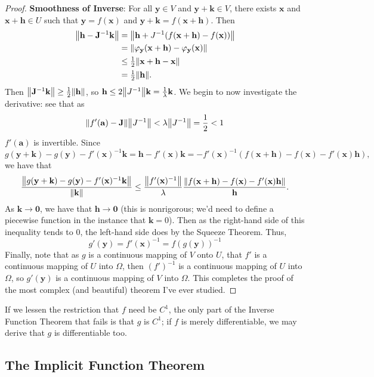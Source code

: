 \documentclass[11pt]{article}
\renewcommand{\vec}[1]{\mathbf{#1}}
\newcommand{\mat}[1]{\mathbf{#1}}
\begin{document}
\begin{adjustwidth}{0.5cm}{}
\begin{proof}
		\textbf{Smoothness of Inverse}: For all $\vec{y} \in V$ and $\vec{y + k} \in V$, there exists $\vec{x}$ and $\vec{x} + \vec{h} \in U$ such that $\vec{y} = f(\vec{x})$ and $\vec{y} + \vec{k} = f(\vec{x} + \vec{h})$. Then
		\begin{align*}
			\norm{\vec{h} - \mat{J}^{-1} \vec{k}} &= \norm{\vec{h} + J^{-1} (f(\vec{x} + \vec{h}) - f(\vec{x}))} \\
			&= \norm{\varphi_{\vec{y}}(\vec{x} + \vec{h}) - \varphi_{\vec{y}}(\vec{x})} \\
			&\le \tfrac{1}{2} \norm{\vec{x} + \vec{h} - \vec{x}} \\
			&= \tfrac{1}{2} \norm{\vec{h}}.
		\end{align*}
		Then $\norm{\mat{J}^{-1} \vec{k}} \ge \tfrac{1}{2} \norm{\vec{h}}$, so $\vec{h} \le 2 \norm{J^{-1}} \vec{k} = \tfrac{1}{\lambda} \vec{k}$. We begin to now investigate the derivative: see that as
		\[
			\norm{f'(\vec{a}) - \mat{J}} \norm{J^{-1}} < \lambda \norm{J^{-1}} = \frac{1}{2} < 1
		\]
		$f'(\vec{a})$ is invertible. Since 
		\[
			g(\vec{y} + \vec{k}) - g(\vec{y}) - f'(\vec{x})^{-1} \vec{k} = \vec{h} - f'(\vec{x}) \vec{k} = -f'(\vec{x})^{-1} (f(\vec{x} + \vec{h}) - f(\vec{x}) - f'(\vec{x}) \vec{h}),
		\]
		we have that
		\[
			\frac{\norm{g(\vec{y} + \vec{k}) - g(\vec{y}) - f'(\vec{x})^{-1} \vec{k}}}{\norm{\vec{k}}} \le \frac{\norm{f'(\vec{x})^{-1}}}{\lambda} \frac{\norm{f(\vec{x} + \vec{h}) - f(\vec{x}) - f'(\vec{x}) \vec{h}}}{\vec{h}}.
		\]
		As $\vec{k} \to \vec{0}$, we have that $\vec{h} \to \vec{0}$ (this is nonrigorous; we'd need to define a piecewise function in the instance that $\vec{k} = 0$). Then as the right-hand side of this inequality tends to $0$, the left-hand side does by the Squeeze Theorem. Thus,
		\[
			g'(\vec{y}) = f'(\vec{x})^{-1} = f(g(\vec{y}))^{-1}
		\]
		Finally, note that as $g$ is a continuous mapping of $V$ onto $U$, that $f'$ is a continuous mapping of $U$ into $\Omega$, then $(f')^{-1}$ is a continuous mapping of $U$ into $\Omega$, so $g'(\vec{y})$ is a continuous mapping of $V$ into $\Omega$. This completes the proof of the most complex (and beautiful) theorem I've ever studied.
	\end{proof}
\end{adjustwidth}

If we lessen the restriction that $f$ need be $C^{1}$, the only part of the Inverse Function Theorem that fails is that $g$ is $C^{1}$; if $f$ is merely differentiable, we may derive that $g$ is differentiable too.


\subsection{The Implicit Function Theorem}

\end{document}
